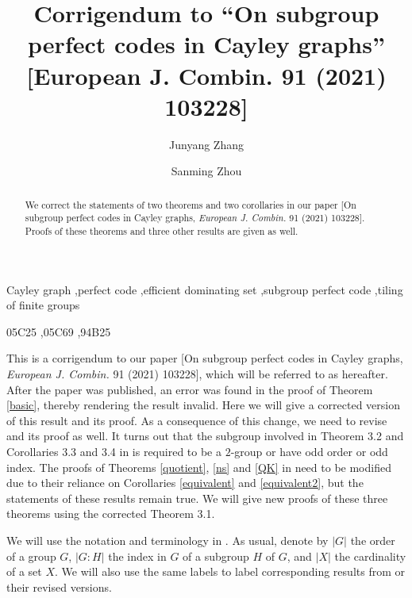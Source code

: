 \documentclass[12pt, a4paper]{article}
\title{Corrigendum to ``On subgroup perfect codes in Cayley graphs'' [European J. Combin. 91 (2021)
103228]}
\author[a]{Junyang Zhang}
\author[b]{Sanming Zhou}
\affil[a]{{\small School of Mathematical Sciences, Chongqing Normal University, Chongqing 401331, P. R. China}}
\affil[b]{{\small School of Mathematics and Statistics, The University of Melbourne, Parkville, VIC 3010, Australia}}
\date{}
\theoremstyle{definition}
\begin{document}
\jot
\maketitle

\renewcommand{\thefootnote}{\empty}%

\begin{abstract}
We correct the statements of two theorems and two corollaries in our paper [On subgroup perfect codes in Cayley graphs, \emph{European J. Combin.} 91 (2021) 103228]. Proofs of these theorems and three other results are given as well.
\end{abstract}

\delete
{
\begin{keyword}
Cayley graph \sep perfect code \sep efficient dominating set \sep subgroup perfect code \sep tiling of finite groups

\MSC[2010] 05C25 \sep 05C69 \sep 94B25

\end{keyword}
}




This is a corrigendum to our paper [On subgroup perfect codes in Cayley graphs, \emph{European J. Combin.} 91 (2021) 103228], which will be referred to as \cite{ZZ21} hereafter. After the paper was published, an error was found in the proof of Theorem \ref{basic}, thereby rendering the result invalid. Here we will give a corrected version of this result and its proof. As a consequence of this change, we need to revise \cite[Theorem 3.2]{ZZ21} and its proof as well. It turns out that the subgroup involved in Theorem 3.2 and Corollaries 3.3 and 3.4 in \cite{ZZ21} is required to be a $2$-group or have odd order or odd index. The proofs of Theorems \ref{quotient}, \ref{ns} and \ref{QK} in \cite{ZZ21} need to be modified due to their reliance on Corollaries \ref{equivalent} and \ref{equivalent2}, but the statements of these results remain true. We will give new proofs of these three theorems using the corrected Theorem 3.1.

We will use the notation and terminology in \cite{ZZ21}. As usual, denote by $|G|$ the order of a group $G$, $|G:H|$ the index in $G$ of a subgroup $H$ of $G$, and $|X|$ the cardinality of a set $X$. We will also use the same labels to label corresponding results from \cite{ZZ21} or their revised versions.
\end{document}
